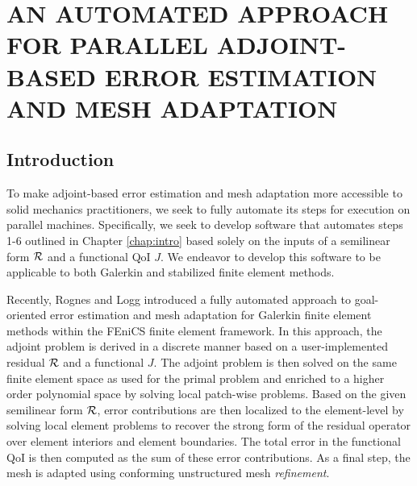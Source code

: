 \chapter{AN AUTOMATED APPROACH FOR PARALLEL ADJOINT-BASED
ERROR ESTIMATION AND MESH ADAPTATION}
\label{chap:automated}

\let\thefootnote\relax{}

\section{Introduction}

To make adjoint-based
error estimation and mesh adaptation more accessible to solid mechanics
practitioners, we seek to fully automate its steps for execution on
parallel machines. Specifically, we seek to
develop software that automates steps 1-6 outlined in Chapter \ref{chap:intro}
based solely on the
inputs of a semilinear form $\mathcal{R}$ and a functional QoI $J$. We endeavor to
develop this software to be applicable to both Galerkin and stabilized
finite element methods.

Recently, Rognes and Logg \cite{rognes2013automated} introduced a fully
automated approach to goal-oriented error estimation and mesh adaptation for
Galerkin finite element methods within the FEniCS \cite{logg2012automated}
finite element framework. In this approach, the adjoint problem is derived
in a discrete manner based on a user-implemented residual $\mathcal{R}$ and a
functional $J$. The adjoint problem is then solved on the same finite element
space as used for the primal problem and enriched to a higher order
polynomial space by solving local patch-wise problems.
Based on the given semilinear form
$\mathcal{R}$, error contributions are then localized to the element-level by solving
local element problems to recover the strong form of the residual operator
over element interiors and element boundaries. The total error in the
functional QoI is then computed as the sum of these error contributions. As a
final step, the mesh is adapted using conforming unstructured mesh
\emph{refinement}.

